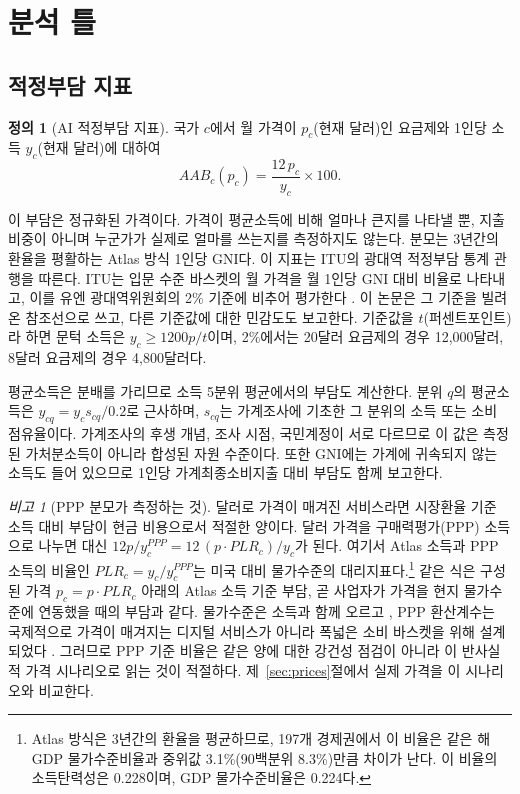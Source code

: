 \documentclass[11pt]{article}
\theoremstyle{definition}
\newtheorem{definition}{정의}
\theoremstyle{remark}
\newtheorem{remark}{비고}
\newcommand{\AAB}{\mathit{AAB}}
\begin{document}
\section{분석 틀}\label{sec:model}

\subsection{적정부담 지표}

\begin{definition}[AI 적정부담 지표]
국가 $c$에서 월 가격이 $p_c$(현재 달러)인 요금제와 1인당 소득 $y_c$(현재 달러)에 대하여
\begin{equation}
\AAB_c(p_c) = \frac{12\,p_c}{y_c}\times 100 .
\label{eq:aab}
\end{equation}
\end{definition}

이 부담은 정규화된 가격이다. 가격이 평균소득에 비해 얼마나 큰지를 나타낼 뿐, 지출 비중이 아니며 누군가가 실제로 얼마를 쓰는지를 측정하지도 않는다. 분모는 3년간의 환율을 평활하는 Atlas 방식 1인당 GNI다. 이 지표는 ITU의 광대역 적정부담 통계 관행을 따른다. ITU는 입문 수준 바스켓의 월 가격을 월 1인당 GNI 대비 비율로 나타내고, 이를 유엔 광대역위원회의 2\% 기준에 비추어 평가한다 \citep{itu2025ff}. 이 논문은 그 기준을 빌려 온 참조선으로 쓰고, 다른 기준값에 대한 민감도도 보고한다. 기준값을 $t$(퍼센트포인트)라 하면 문턱 소득은 $y_c\geq1200p/t$이며, 2\%에서는 20달러 요금제의 경우 12,000달러, 8달러 요금제의 경우 4,800달러다.

평균소득은 분배를 가리므로 소득 5분위 평균에서의 부담도 계산한다. 분위 $q$의 평균소득은 $y_{cq}=y_c s_{cq}/0.2$로 근사하며, $s_{cq}$는 가계조사에 기초한 그 분위의 소득 또는 소비 점유율이다. 가계조사의 후생 개념, 조사 시점, 국민계정이 서로 다르므로 이 값은 측정된 가처분소득이 아니라 합성된 자원 수준이다. 또한 GNI에는 가계에 귀속되지 않는 소득도 들어 있으므로 1인당 가계최종소비지출 대비 부담도 함께 보고한다.

\begin{remark}[PPP 분모가 측정하는 것]\label{rem:ppp}
달러로 가격이 매겨진 서비스라면 시장환율 기준 소득 대비 부담이 현금 비용으로서 적절한 양이다. 달러 가격을 구매력평가(PPP) 소득으로 나누면 대신 $12p/y^{PPP}_c = 12\,(p\cdot PLR_c)/y_c$가 된다. 여기서 Atlas 소득과 PPP 소득의 비율인 $PLR_c = y_c/y^{PPP}_c$는 미국 대비 물가수준의 대리지표다.\footnote{Atlas 방식은 3년간의 환율을 평균하므로, 197개 경제권에서 이 비율은 같은 해 GDP 물가수준비율과 중위값 3.1\%(90백분위 8.3\%)만큼 차이가 난다. 이 비율의 소득탄력성은 0.228이며, GDP 물가수준비율은 0.224다.} 같은 식은 구성된 가격 $p_c=p\cdot PLR_c$ 아래의 Atlas 소득 기준 부담, 곧 사업자가 가격을 현지 물가수준에 연동했을 때의 부담과 같다. 물가수준은 소득과 함께 오르고 \citep{balassa1964purchasing,samuelson1964theoretical}, PPP 환산계수는 국제적으로 가격이 매겨지는 디지털 서비스가 아니라 폭넓은 소비 바스켓을 위해 설계되었다 \citep{deaton2010understanding}. 그러므로 PPP 기준 비율은 같은 양에 대한 강건성 점검이 아니라 이 반사실적 가격 시나리오로 읽는 것이 적절하다. 제~\ref{sec:prices}절에서 실제 가격을 이 시나리오와 비교한다.
\end{remark}
\end{document}
